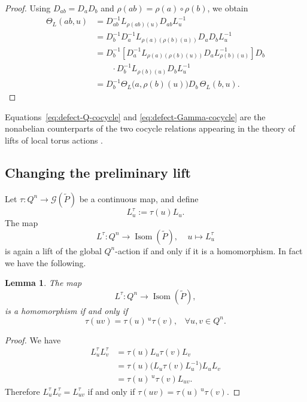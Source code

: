 \documentclass[11pt,a4paper]{article}
\numberwithin{equation}{section}
\newtheorem{lemma}[definition]{Lemma}
\theoremstyle{named}
\begin{document}
\begin{proof}
Using \(D_{ab}=D_aD_b\) and $\rho(ab)=\rho(a)\circ\rho(b)$,
we obtain
\begin{align*}
\Theta_L(ab,u)
&=
D_{ab}^{-1}
L_{\rho(ab)(u)}
D_{ab}
L_u^{-1}
\\
&=
D_b^{-1}D_a^{-1}
L_{\rho(a)(\rho(b)(u))}
D_aD_b
L_u^{-1}
\\
&=
D_b^{-1}
\left[
D_a^{-1}
L_{\rho(a)(\rho(b)(u))}
D_a
L_{\rho(b)(u)}^{-1}
\right]
D_b
\\
&\qquad\cdot
D_b^{-1}
L_{\rho(b)(u)}
D_b
L_u^{-1}
\\
&=
D_b^{-1}
\Theta_L\bigl(a,\rho(b)(u)\bigr)
D_b\,
\Theta_L(b,u).
\end{align*}
\end{proof}

Equations~\eqref{eq:defect-Q-cocycle} and \eqref{eq:defect-Gamma-cocycle} are the nonabelian counterparts of the two cocycle relations appearing in the theory of lifts of local torus actions \cite{Yoshida1}.

\subsection{Changing the preliminary lift}

Let $\tau:Q^n\longrightarrow\mathcal G(\widetilde P)$ be a continuous map, and define
\[
L_u^\tau:=\tau(u)L_u.
\]
\noindent The map
\[
L^\tau:Q^n\longrightarrow\operatorname{Isom}(\widetilde P),\;\;\;\;u\mapsto L_u^\tau\] is again a lift of the global \(Q^n\)-action  if and only if it is a homomorphism. In fact we have the following.

\begin{lemma}
\label{lem:gauge-modified-global-lift}
 The map
\[
L^\tau:Q^n\longrightarrow\operatorname{Isom}(\widetilde P),
\]
is a homomorphism if and only if
\begin{equation}
\label{eq:tau-crossed-cocycle}
\tau(uv)
=
\tau(u)\,{}^u\tau(v),\;\;\;\forall u,v\in Q^n.
\end{equation}
\end{lemma}

\begin{proof}
We have
\begin{align*}
L_u^\tau L_v^\tau
&=
\tau(u)L_u\tau(v)L_v
\\
&=
\tau(u)
\bigl(L_u\tau(v)L_u^{-1}\bigr)
L_uL_v
\\
&=
\tau(u)\,{}^u\tau(v)L_{uv}.
\end{align*}
Therefore $L_u^\tau L_v^\tau=L_{uv}^\tau$
if and only if $\tau(uv)=\tau(u)\,{}^u\tau(v)$.
\end{proof}
\end{document}
